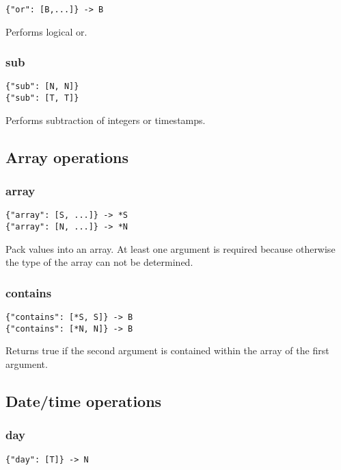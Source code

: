 \documentclass[a4paper]{article}
\begin{document}
\begin{verbatim}
{"or": [B,...]} -> B
\end{verbatim}

Performs logical or. 

\subsubsection{sub}

\begin{verbatim}
{"sub": [N, N]}
{"sub": [T, T]}
\end{verbatim}

Performs subtraction of integers or timestamps.

\subsection{Array operations}

\subsubsection{array}

\begin{verbatim}
{"array": [S, ...]} -> *S
{"array": [N, ...]} -> *N
\end{verbatim}

Pack values into an array. At least one argument is required because otherwise the type of the array can not be determined.

\subsubsection{contains}

\begin{verbatim}
{"contains": [*S, S]} -> B
{"contains": [*N, N]} -> B
\end{verbatim}

Returns true if the second argument is contained within the array of the first argument. 

\subsection{Date/time operations}

\subsubsection{day}

\begin{verbatim}
{"day": [T]} -> N
\end{verbatim}
\end{document}
